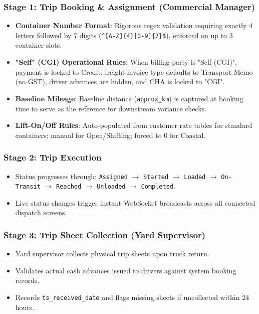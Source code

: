 \documentclass[11pt,a4paper]{article}
\begin{document}
\subsubsection{Stage 1: Trip Booking \& Assignment (Commercial Manager)}
\begin{itemize}[leftmargin=1.2em,itemsep=3pt]
  \item \textbf{Container Number Format}: Rigorous regex validation requiring exactly 4 letters followed by 7 digits (\texttt{\^{}[A-Z]\{4\}[0-9]\{7\}\$}), enforced on up to 3 container slots.
  \item \textbf{"Self" (CGI) Operational Rules}: When billing party is "Self (CGI)", payment is locked to Credit, freight invoice type defaults to Transport Memo (no GST), driver advances are hidden, and CHA is locked to "CGI".
  \item \textbf{Baseline Mileage}: Baseline distance (\texttt{approx\_km}) is captured at booking time to serve as the reference for downstream variance checks.
  \item \textbf{Lift-On/Off Rules}: Auto-populated from customer rate tables for standard containers; manual for Open/Shifting; forced to 0 for Coastal.
\end{itemize}

\subsubsection{Stage 2: Trip Execution}
\begin{itemize}[leftmargin=1.2em,itemsep=3pt]
  \item Status progresses through: \texttt{Assigned} $\rightarrow$ \texttt{Started} $\rightarrow$ \texttt{Loaded} $\rightarrow$ \texttt{On-Transit} $\rightarrow$ \texttt{Reached} $\rightarrow$ \texttt{Unloaded} $\rightarrow$ \texttt{Completed}.
  \item Live status changes trigger instant WebSocket broadcasts across all connected dispatch screens.
\end{itemize}

\subsubsection{Stage 3: Trip Sheet Collection (Yard Supervisor)}
\begin{itemize}[leftmargin=1.2em,itemsep=3pt]
  \item Yard supervisor collects physical trip sheets upon truck return.
  \item Validates actual cash advances issued to drivers against system booking records.
  \item Records \texttt{ts\_received\_date} and flags missing sheets if uncollected within 24 hours.
\end{itemize}
\end{document}
